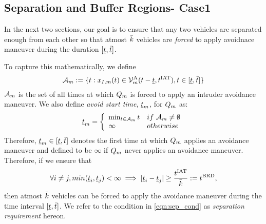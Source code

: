 \subsection{Separation and Buffer Regions- Case1} \label{sec:case1}
In the next two sections, our goal is to ensure that any two vehicles are separated enough from each other so that %
atmost $\bar{k}$ vehicles are \textit{forced} to apply avoidnace maneuver during the duration $[\underline{t}, \bar{t}]$. 

To capture this mathematically, we define 
\begin{equation*}
\mathcal{A}_{m} := \{t: x_{I,m}(t) \in \mathcal{V}^{\text{A}}_{m}(t-\underline{t}, t^\text{IAT}), t \in [\underline{t}, \bar{t}]\}
\end{equation*} 
$\mathcal{A}_{m}$ is the set of all times at which $Q_m$ is forced to apply an intruder avoidance maneuver. We also define \textit{avoid start time}, $\underline{t}_m$, for $Q_m$ as:
\begin{equation}
\underline{t}_m  = 
\left \{ 
\begin{array}{ll}
\min_{t \in  \mathcal{A}_{m}} t & \relax{if~} \mathcal{A}_{m} \neq \emptyset\\
\infty & \relax{otherwise}
\end{array}
\right.
\end{equation}  
Therefore, $\underline{t}_m \in [\underline{t}, \bar{t}]$ denotes the first time at which $Q_m$ applies an avoidance maneuver and defined to be $\infty$ if $Q_m$ never applies an avoidance maneuver. %
Therefore, if we ensure that 
\begin{equation} \label{eqn:sep_cond}
\forall i \neq j, min(\tsa_i, \tsa_j)< \infty \implies |\tsa_i - \tsa_j| \geq \frac{\iat}{\nva} := \brd,
\end{equation}
then atmost $\bar{k}$ vehicles can be forced to apply the avoidance maneuver during the time interval $[\underline{t}, \bar{t}]$. We refer to the condition in \eqref{eqn:sep_cond} as \textit{separation requirement} hereon. 

